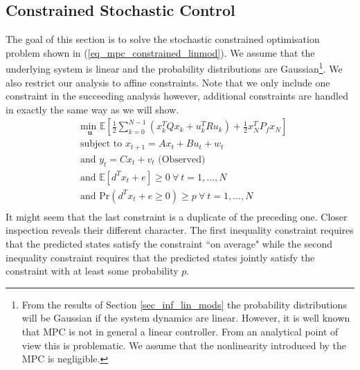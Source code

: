 \subsection{Constrained Stochastic Control}
The goal of this section is to solve the stochastic constrained optimisation problem shown in (\ref{eq_mpc_constrained_linmod}). We assume that the underlying system is linear and the probability distributions are Gaussian\footnote{From the results of Section \ref{sec_inf_lin_mods} the probability distributions will be Gaussian if the system dynamics are linear. However, it is well known \cite{mac} that MPC is not in general a linear controller. From an analytical point of view this is problematic. We assume that the nonlinearity introduced by the MPC is negligible.}. We also restrict our analysis to affine constraints. Note that we only include one constraint in the succeeding analysis however, additional constraints are handled in exactly the same way as we will show.
\begin{equation}
\begin{aligned}
&\underset{\mathbf{u}}{\text{min }} \mathbb{E}\left[ \frac{1}{2}\sum_{k=0}^{N-1} \left( x_k^TQx_k + u_k^TRu_k \right) + \frac{1}{2}x_N^TP_fx_N \right] \\
& \text{subject to } x_{t+1}=Ax_t+Bu_t + w_t \\
& \text{and } y_{t}= Cx_t + v_t \text{ (Observed)}\\
& \text{and } \mathbb{E}[d^Tx_t + e] \geq 0 ~\forall ~t=1,...,N \\
& \text{and } \text{Pr}(d^Tx_t + e \geq 0) \geq p ~\forall ~t=1,...,N\\
\end{aligned}
\label{eq_mpc_constrained_linmod}
\end{equation}
It might seem that the last constraint is a duplicate of the preceding one. Closer inspection reveals their different character. The first inequality constraint requires that the predicted states satisfy the constraint ``on average" while the second inequality constraint requires that the predicted states jointly satisfy the constraint with at least some probability $p$.

